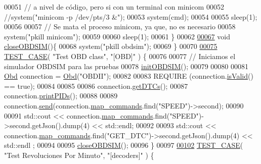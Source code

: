 \begin{DoxyCode}
{00051     \textcolor{comment}{// a nivel de código, pero si con un terminal con minicom}
00052     \textcolor{comment}{//system("minicom -p /dev/pts/3 &");}
00053     system(cmd);
00054 
00055     sleep(1);
00056 
00057     \textcolor{comment}{// Se mata el proceso minicom, ya que, no es necesario}
00058     system(\textcolor{stringliteral}{"pkill minicom"});
00059 
00060     sleep(1);
00061 \}
00062 
\hyperlink{UnitTestCase_8cpp_ad24bf860f798931c63aaa488e08b8b4e}{00067} \textcolor{keywordtype}{void} \hyperlink{UnitTestCase_8cpp_ad24bf860f798931c63aaa488e08b8b4e}{closeOBDSIM}()\{
00068     system(\textcolor{stringliteral}{"pkill obdsim"});
00069 \}
00070 
\hyperlink{UnitTestCase_8cpp_a094ceea8956a9b495823bde621ea759a}{00075} \hyperlink{UnitTestCase_8cpp_a094ceea8956a9b495823bde621ea759a}{TEST\_CASE}( \textcolor{stringliteral}{"Test OBD class"}, \textcolor{stringliteral}{"[OBD]"} ) \{
00076     
00077     \textcolor{comment}{// Iniciamos el simulador OBDSIM para las pruebas}
00078     \hyperlink{UnitTestCase_8cpp_a4460093e274738a0e1bbb551c1d1d3fd}{initOBDSIM}();
00079 
00080 
00081     \hyperlink{classObd}{Obd} connection = \hyperlink{classObd}{Obd}(\textcolor{stringliteral}{"OBDII"});
00082 
00083     REQUIRE (connection.\hyperlink{classObd_ae28b765bb787467f929eae932133d2aa}{isValid}() == \textcolor{keyword}{true});
00084 
00085 
00086     connection.\hyperlink{classObd_ac57afb9228d933c6be5b2fa8e6446036}{getDTCs}();
00087     connection.\hyperlink{classObd_abf7e84f45236ea1c78c762ac895c532c}{printPIDs}();
00088 
00089     connection.\hyperlink{classObd_a453591bc9a280e8d44d82025ce8590e9}{send}(connection.\hyperlink{classObd_a8300062d1b651d049cf2a2bc916496cd}{map\_commands}.find(\textcolor{stringliteral}{"SPEED"})->second);
00090 
00091     std::cout << connection.\hyperlink{classObd_a8300062d1b651d049cf2a2bc916496cd}{map\_commands}.find(\textcolor{stringliteral}{"SPEED"})->second.getJson().dump(4) << std::endl;
00092 
00093     std::cout << connection.\hyperlink{classObd_a8300062d1b651d049cf2a2bc916496cd}{map\_commands}.find(\textcolor{stringliteral}{"GET\_DTC"})->second.getJson().dump(4) << std::endl
      ;
00094 
00095     \hyperlink{UnitTestCase_8cpp_ad24bf860f798931c63aaa488e08b8b4e}{closeOBDSIM}();
00096 \}
00097 
\hyperlink{UnitTestCase_8cpp_aa01bede4cf032808617f744cfdc34e85}{00102} \hyperlink{UnitTestCase_8cpp_a094ceea8956a9b495823bde621ea759a}{TEST\_CASE}( \textcolor{stringliteral}{"Test Revoluciones Por Minuto"}, \textcolor{stringliteral}{"[decoders]"} ) \{
}
\end{DoxyCode}
